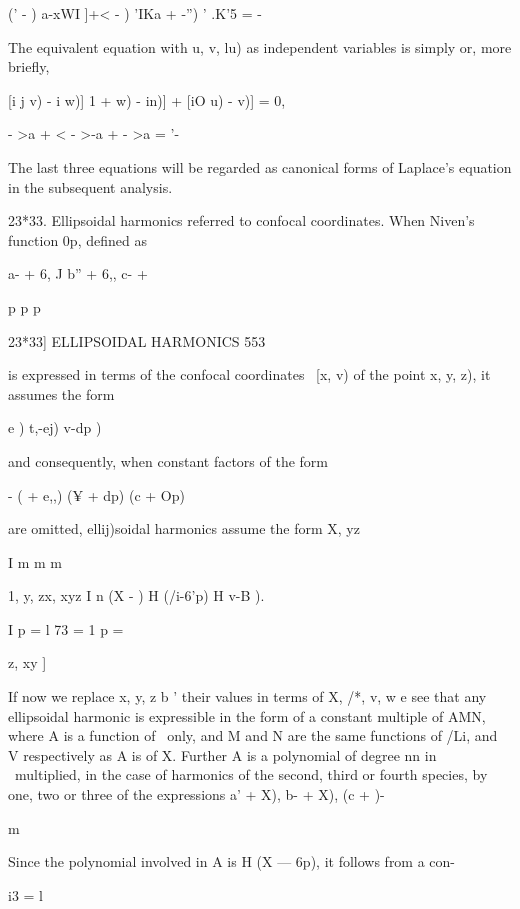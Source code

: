 {{{(' - ) a-xWI ]+< - ) 'IKa + -'') ' .K'5 = -



The equivalent equation with u, v, lu) as independent variables is
simply or, more briefly,



[i j v) - i w)] 1 + w) - in)] + [iO u) - v)] = 0,



 - >a + < - >-a + - >a = '-

The last three equations will be regarded as canonical forms of
Laplace's equation in the subsequent analysis.

23*33. Ellipsoidal harmonics referred to confocal coordinates. When
Niven's function 0p, defined as



a- + 6, J b'' + 6,, c- +



p p p



23*33] ELLIPSOIDAL HARMONICS 553

is expressed in terms of the confocal coordinates \ [x, v) of the
point x, y, z), it assumes the form

  e ) t,-ej) v-dp )

and consequently, when constant factors of the form

- ( + e,,) (¥ + dp) (c + Op)

are omitted, ellij)soidal harmonics assume the form X, yz \

I m m m

1, y, zx, xyz I n (X - ) H (/i-6'p) H v-B ).

I p = l 73 = 1 p = \

z, xy ]

If now we replace x, y, z b ' their values in terms of X, /*, v, w e
see that any ellipsoidal harmonic is expressible in the form of a
constant multiple of AMN, where A is a function of \ only, and M and N
are the same functions of /Li, and V respectively as A is of X.
Further A is a polynomial of degree nn in \ multiplied, in the case of
harmonics of the second, third or fourth species, by one, two or three
of the expressions \/ a' + X), \/ b- + X), \/(c + )-

m

Since the polynomial involved in A is H (X — 6p), it follows from a
con-



i3 = l



}}}

